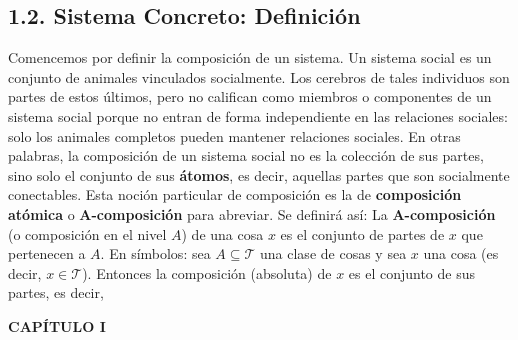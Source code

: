 {\subsection*{1.2. Sistema Concreto: Definición}
Comencemos por definir la composición de un sistema. Un sistema social es un conjunto de animales vinculados socialmente. Los cerebros de tales individuos son partes de estos últimos, pero no califican como miembros o componentes de un sistema social porque no entran de forma independiente en las relaciones sociales: solo los animales completos pueden mantener relaciones sociales. En otras palabras, la composición de un sistema social no es la colección de sus partes, sino solo el conjunto de sus \textbf{átomos}, es decir, aquellas partes que son socialmente conectables. Esta noción particular de composición es la de \textbf{composición atómica} o \textbf{A-composición} para abreviar. Se definirá así: La \textbf{A-composición} (o composición en el nivel $A$) de una cosa $x$ es el conjunto de partes de $x$ que pertenecen a $A$. En símbolos: sea $A \subseteq \mathcal{T}$ una clase de cosas y sea $x$ una cosa (es decir, $x \in \mathcal{T}$). Entonces la composición (absoluta) de $x$ es el conjunto de sus partes, es decir,
}

\newpage
\fancyhf{}
\fancyhead[l]{\thepage} 

\begin{center}
{\fontsize{18}{20}\selectfont \textbf{CAPÍTULO I}}
\end{center}

\vspace{1cm}


